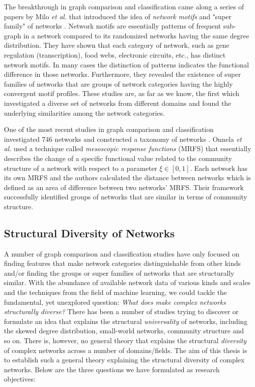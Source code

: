 \documentclass[..]{revtex4}
\begin{document}
	The breakthrough in graph comparison and classification came along a series of papers by Milo \textit{et al.} that introduced the idea of \textit{network motifs} and "super family" of networks \cite{Milo_motif, Milo_SuperFamily}. Network motifs are essentially patterns of frequent sub-graph in a network compared to its randomized networks having the same degree distribution\cite{Milo_motif}. They have shown that each category of network, such as gene regulation (transcription), food webs, electronic circuits, etc., has distinct network motifs. In many cases the distinction of patterns indicates the functional difference in those networks. Furthermore, they revealed the existence of super families of networks that are groups of network categories having the highly convergent motif profiles. These studies are, as far as we know, the first which investigated a diverse set of networks from different domains and found the underlying similarities among the network categories.
	
	One of the most recent studies in graph comparison and classification investigated 746 networks and constructed a taxonomy of networks \cite{Onnela_Taxonomy}.  Onnela \textit{et al.} used a technique called \textit{mesoscopic response functions} (MRFS) that essentially describes the change of a specific functional value related to the community structure of a network with respect to a parameter $\xi \in [0,1]$. Each network has its own MRFS and the authors calculated the distance between networks which is defined as an area of difference between two networks' MRFS. Their framework successfully identified groups of networks that are similar in terms of community structure.

	
	
	\subsection{Structural Diversity of Networks}
	A number of graph comparison and classification studies have only focused on finding features that make network categories distinguishable from other kinds and/or finding the groups or super families of networks that are structurally similar. With the abundance of available network data of various kinds and scales and the techniques from the field of machine learning, we could tackle the fundamental, yet unexplored question: \textit{What does make complex networks structurally diverse?} There has been a number of studies trying to discover or formulate an idea that explains the structural \textit{universality} of networks, including the skewed degree distribution, small-world networks, community structure and so on. There is, however, no general theory that explains the structural \textit{diversity} of complex networks across a number of domains/fields. The aim of  this thesis is to establish such a general theory explaining the structural diversity of complex networks. Below are the three  questions we have formulated as research objectives:
\end{document}
